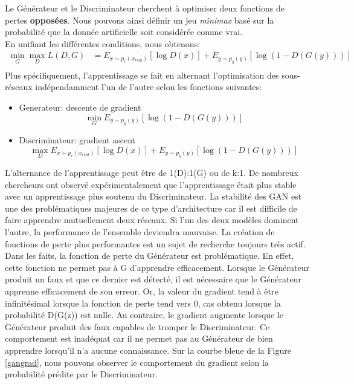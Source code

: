\noindent Le Générateur et le Discriminateur cherchent à optimiser deux fonctions de pertes \textbf{opposées}. Nous pouvons ainsi définir un jeu \textit{minimax} basé sur la probabilité que la donnée artificielle soit considérée comme vrai.\\

\noindent En unifiant les différentes conditions, nous obtenons:
$$\begin{aligned}
\min_G \max_D L(D, G)
& = {E}_{x \sim p_{r}(x_{real})} [\log D(x)] + {E}_{y \sim p_y(y)} [\log(1 - D(G(y)))] \\
\end{aligned}$$
\noindent Plus spécifiquement, l'apprentissage se fait en alternant l'optimisation des sous-réseaux indépendamment l'un de l'autre selon les fonctions suivantes:
\begin{itemize}
    \item Generateur: descente de gradient
    $$\min_G {E}_{y \sim p_y(y)} [\log(1 - D(G(y)))]$$
    \item Discriminateur: gradient ascent
    $$\max_D {E}_{x \sim p_{r}(x_{real})} [\log D(x)] + {E}_{y \sim p_y(y)} [\log(1 - D(G(y)))] $$
\end{itemize}

\noindent L'alternance de l'apprentissage peut être de 1(D):1(G) ou de k:1. De nombreux chercheurs ont observé expérimentalement que l'apprentissage était plus stable avec un apprentissage plus soutenu du Discriminateur. La stabilité des GAN est une des problématiques majeures de ce type d'architecture car il est difficile de faire apprendre mutuellement deux réseaux. Si l'un des deux modèles dominent l'autre, la performance de l'ensemble deviendra mauvaise. La création de fonctions de perte plus performantes est un sujet de recherche toujours très actif.\\

\noindent Dans les faits, la fonction de perte du Générateur est problématique. En effet, cette fonction ne permet pas à G d'apprendre efficacement. Lorsque le Générateur produit un faux et que ce dernier est détecté, il est nécessaire que le Générateur apprenne efficacement de son erreur. Or, la valeur du gradient tend à être infinitésimal lorsque la fonction de perte tend vers 0, cas obtenu lorsque la probabilité D(G(z)) est nulle. Au contraire, le gradient augmente lorsque le Générateur produit des faux capables de tromper le Discriminateur. Ce comportement est inadéquat car il ne permet pas au Générateur de bien apprendre lorsqu'il n'a aucune connaissance. Sur la courbe bleue de la Figure \ref{gangrad}, nous pouvons observer le comportement du gradient selon la probabilité prédite par le Discriminateur.\\

